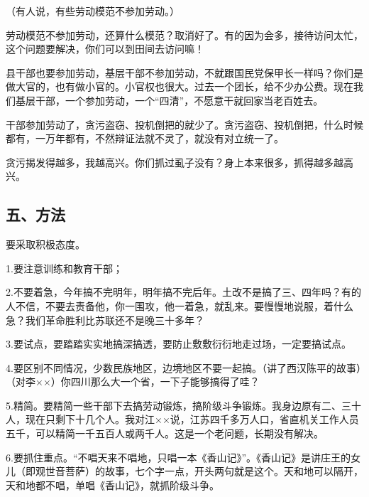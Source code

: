 （有人说，有些劳动模范不参加劳动。）

劳动模范不参加劳动，还算什么模范？取消好了。有的因为会多，接待访问太忙，这个问题要解决，你们可以到田间去访问嘛！

县干部也要参加劳动，基层干部不参加劳动，不就跟国民党保甲长一样吗？你们是做大官的，也有做小官的。小官权也很大。过去一个团长，给不少办公费。现在我们基层干部，一个参加劳动，一个“四清”，不愿意干就回家当老百姓去。

干部参加劳动了，贪污盗窃、投机倒把的就少了。贪污盗窃、投机倒把，什么时候都有，一万年都有，不然辩证法就不灵了，就没有对立统一了。

贪污揭发得越多，我越高兴。你们抓过虱子没有？身上本来很多，抓得越多越高兴。

\subsection{五、方法}

要采取积极态度。

1.要注意训练和教育干部；

2.不要着急，今年搞不完明年，明年搞不完后年。土改不是搞了三、四年吗？有的人不信，不要去责备他，你一围攻，他一着急，就乱来。要慢慢地说服，着什么急？我们革命胜利比苏联还不是晚三十多年？

3.要试点，要踏踏实实地搞深搞透，要防止敷敷衍衍地走过场，一定要搞试点。

4.要区别不同情况，少数民族地区，边境地区不要一起搞。（讲了西汉陈平的故事）（对李××）你四川那么大一个省，一下子能够搞得了哇？

5.精简。要精简一些干部下去搞劳动锻炼，搞阶级斗争锻炼。我身边原有二、三十人，现在只剩下十几个人。我对江××说，江苏四千多万人口，省直机关工作人员五千，可以精简一千五百人或两千人。这是一个老问题，长期没有解决。

6.要抓住重点。“不唱天来不唱地，只唱一本《香山记》”。《香山记》是讲庄王的女儿（即观世音菩萨）的故事，七个字一点，开头两句就是这个。天和地可以隔开，天和地都不唱，单唱《香山记》，就抓阶级斗争。


